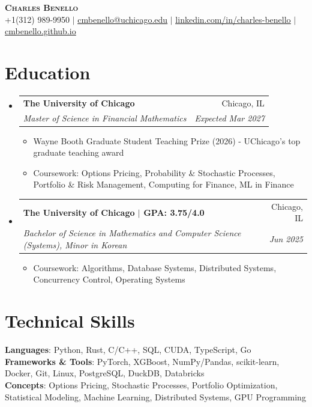 \documentclass[letterpaper,10pt]{article}
\makeatletter
\newcommand{\resumeItem}[1]{
  \item\small{
    {#1 \vspace{-3pt}}
  }
}
\newcommand{\resumeSubheading}[4]{
  \item
    \begin{tabular*}{0.99\textwidth}[t]{l@{\extracolsep{\fill}}r}
      \textbf{#1} & #2 \\
      \textit{\small#3} & \textit{\small #4} \\
    \end{tabular*}\vspace{-8pt}
}
\newcommand{\resumeSubHeadingListStart}{\begin{itemize}[leftmargin=0.015in, label={}]}
\newcommand{\resumeSubHeadingListEnd}{\end{itemize}}
\newcommand{\resumeItemListStart}{\begin{itemize}[leftmargin=0.15in]}
\newcommand{\resumeItemListEnd}{\end{itemize}\vspace{-7pt}}
\makeatother
\begin{document}
\begin{center}
    \textbf{\Huge \scshape Charles Benello} \\ \vspace{1pt}
    \small +1(312) 989-9950 $|$ \href{mailto:cmbenello@uchicago.edu}{\underline{cmbenello@uchicago.edu}} $|$
    \href{https://linkedin.com/in/charles-benello/}{\underline{linkedin.com/in/charles-benello}} $|$
    \href{https://cmbenello.github.io}{\underline{cmbenello.github.io}}
\end{center}

\section{Education}
  \resumeSubHeadingListStart
    \resumeSubheading
      {The University of Chicago}{Chicago, IL}
      {Master of Science in Financial Mathematics}{Expected Mar 2027}
      \resumeItemListStart
        \resumeItem{Wayne Booth Graduate Student Teaching Prize (2026) - UChicago's top graduate teaching award}
        \resumeItem{Coursework: Options Pricing, Probability \& Stochastic Processes, Portfolio \& Risk Management, Computing for Finance, ML in Finance}
      \resumeItemListEnd
    \resumeSubheading
      {The University of Chicago \textbf{$|$ GPA: 3.75/4.0}}{Chicago, IL}
      {Bachelor of Science in Mathematics and Computer Science (Systems), Minor in Korean}{Jun 2025}
      \resumeItemListStart
        \resumeItem{Coursework: Algorithms, Database Systems, Distributed Systems, Concurrency Control, Operating Systems}
      \resumeItemListEnd
  \resumeSubHeadingListEnd

\section{Technical Skills}
 \begin{itemize}[leftmargin=0.015in, label={}]
    \small{\item{
     \textbf{Languages}{: Python, Rust, C/C++, SQL, CUDA, TypeScript, Go} \\
     \textbf{Frameworks \& Tools}{: PyTorch, XGBoost, NumPy/Pandas, scikit-learn, Docker, Git, Linux, PostgreSQL, DuckDB, Databricks} \\
     \textbf{Concepts}{: Options Pricing, Stochastic Processes, Portfolio Optimization, Statistical Modeling, Machine Learning, Distributed Systems, GPU Programming}
    }}
 \end{itemize}\vspace{-9pt}
\end{document}
